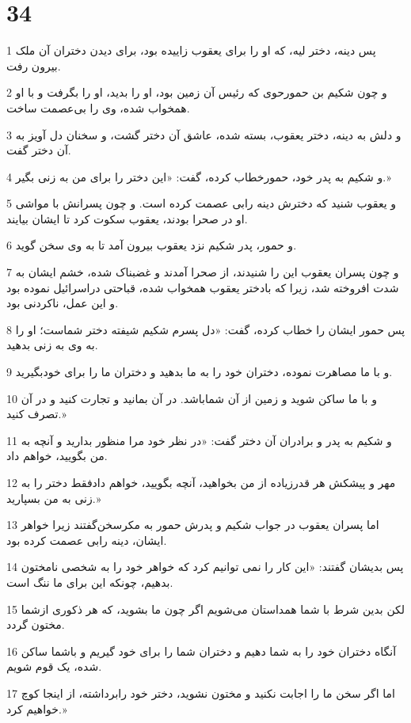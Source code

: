 \chapter{34}

\par 1 پس دینه، دختر لیه، که او را برای یعقوب زاییده بود، برای دیدن دختران آن ملک بیرون رفت.
\par 2 و چون شکیم بن حمورحوی که رئیس آن زمین بود، او را بدید، او را بگرفت و با او همخواب شده، وی را بی‌عصمت ساخت.
\par 3 و دلش به دینه، دختر یعقوب، بسته شده، عاشق آن دختر گشت، و سخنان دل آویز به آن دختر گفت.
\par 4 و شکیم به پدر خود، حمورخطاب کرده، گفت: «این دختر را برای من به زنی بگیر.»
\par 5 و یعقوب شنید که دخترش دینه رابی عصمت کرده است. و چون پسرانش با مواشی او در صحرا بودند، یعقوب سکوت کرد تا ایشان بیایند.
\par 6 و حمور، پدر شکیم نزد یعقوب بیرون آمد تا به وی سخن گوید.
\par 7 و چون پسران یعقوب این را شنیدند، از صحرا آمدند و غضبناک شده، خشم ایشان به شدت افروخته شد، زیرا که بادختر یعقوب همخواب شده، قباحتی دراسرائیل نموده بود و این عمل، ناکردنی بود.
\par 8 پس حمور ایشان را خطاب کرده، گفت: «دل پسرم شکیم شیفته دختر شماست؛ او را به وی به زنی بدهید.
\par 9 و با ما مصاهرت نموده، دختران خود را به ما بدهید و دختران ما را برای خودبگیرید.
\par 10 و با ما ساکن شوید و زمین از آن شماباشد. در آن بمانید و تجارت کنید و در آن تصرف کنید.»
\par 11 و شکیم به پدر و برادران آن دختر گفت: «در نظر خود مرا منظور بدارید و آنچه به من بگویید، خواهم داد.
\par 12 مهر و پیشکش هر قدرزیاده از من بخواهید، آنچه بگویید، خواهم دادفقط دختر را به زنی به من بسپارید.»
\par 13 اما پسران یعقوب در جواب شکیم و پدرش حمور به مکرسخن‌گفتند زیرا خواهر ایشان، دینه رابی عصمت کرده بود.
\par 14 پس بدیشان گفتند: «این کار را نمی توانیم کرد که خواهر خود را به شخصی نامختون بدهیم، چونکه این برای ما ننگ است.
\par 15 لکن بدین شرط با شما همداستان می‌شویم اگر چون ما بشوید، که هر ذکوری ازشما مختون گردد.
\par 16 آنگاه دختران خود را به شما دهیم و دختران شما را برای خود گیریم و باشما ساکن شده، یک قوم شویم.
\par 17 اما اگر سخن ما را اجابت نکنید و مختون نشوید، دختر خود رابرداشته، از اینجا کوچ خواهیم کرد.»
